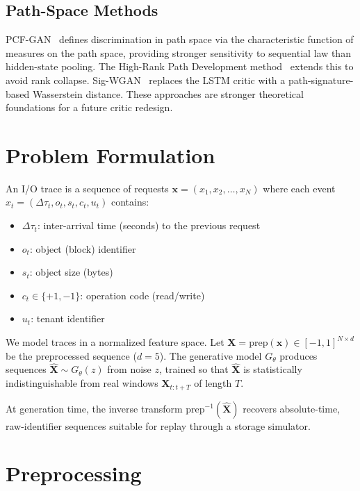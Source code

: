 \documentclass[10pt,twocolumn]{article}
\begin{document}
\subsection{Path-Space Methods}

PCF-GAN~\cite{pcfgan2023} defines discrimination in path space via the
characteristic function of measures on the path space, providing
stronger sensitivity to sequential law than hidden-state pooling.
The High-Rank Path Development method~\cite{hrpcf2024} extends this
to avoid rank collapse.  Sig-WGAN~\cite{sigwgan2021} replaces the
LSTM critic with a path-signature-based Wasserstein distance.  These
approaches are stronger theoretical foundations for a future critic
redesign.


\section{Problem Formulation}
\label{sec:problem}

An I/O trace is a sequence of requests
$\mathbf{x} = (x_1, x_2, \ldots, x_N)$ where each event
$x_t = (\Delta\tau_t, o_t, s_t, c_t, u_t)$ contains:
\begin{itemize}
  \item $\Delta\tau_t$: inter-arrival time (seconds) to the previous request
  \item $o_t$: object (block) identifier
  \item $s_t$: object size (bytes)
  \item $c_t \in \{+1,-1\}$: operation code (read/write)
  \item $u_t$: tenant identifier
\end{itemize}

We model traces in a normalized feature space.  Let
$\mathbf{X} = \text{prep}(\mathbf{x}) \in [-1,1]^{N \times d}$
be the preprocessed sequence ($d = 5$).  The generative model
$G_\theta$ produces sequences $\hat{\mathbf{X}} \sim G_\theta(z)$
from noise $z$, trained so that $\hat{\mathbf{X}}$ is
statistically indistinguishable from real windows
$\mathbf{X}_{t:t+T}$ of length $T$.

At generation time, the inverse transform
$\text{prep}^{-1}(\hat{\mathbf{X}})$ recovers absolute-time,
raw-identifier sequences suitable for replay through a storage
simulator.


\section{Preprocessing}
\label{sec:preprocessing}
\end{document}
